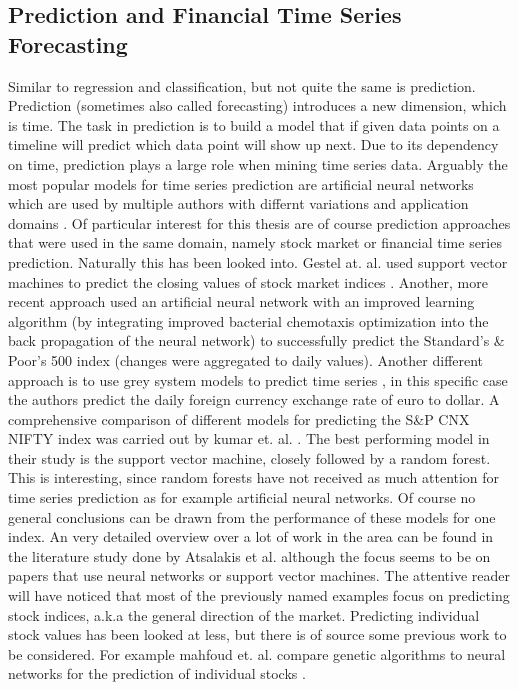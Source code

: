 \subsection{Prediction and Financial Time Series Forecasting}
\label{subsec_prediction}
Similar to regression and classification, but not quite the same is prediction. Prediction (sometimes also called forecasting) introduces a new dimension, which is time. The task in prediction is to build a model that if given data points on a timeline will predict which data point will show up next.
Due to its dependency on time, prediction plays a large role when mining time series data. Arguably the most popular models for time series prediction are artificial neural networks which are used by multiple authors with differnt variations and application domains \cite{connor1994recurrent} \cite{martinetz1993neural} \cite{frank2001time}. Of particular interest for this thesis are of course prediction approaches that were used in the same domain, namely stock market or financial time series prediction. Naturally this has been looked into. Gestel at. al. used support vector machines to predict the closing values of stock market indices \cite{van2001financial}.%
Another, more recent approach used an artificial neural network with an improved learning algorithm (by integrating improved bacterial chemotaxis optimization into the back propagation of the neural network) to successfully predict the Standard’s \& Poor’s 500 index (changes were aggregated to daily values).
Another different approach is to use grey system models to predict time series \citep{kayacan2010grey}, in this specific case the authors predict the daily foreign currency exchange rate of euro to dollar. A comprehensive comparison of different models for predicting the S\&P CNX NIFTY index was carried out by kumar et. al. \citep{kumar2006forecasting}. The best performing model in their study is the support vector machine, closely followed by a random forest. This is interesting, since random forests have not received as much attention for time series prediction as for example artificial neural networks. Of course no general conclusions can be drawn from the performance of these models for one index. An very detailed overview over a lot of work in the area can be found in the literature study done by Atsalakis et al. \cite{atsalakis2009surveying} although the focus seems to be on papers that use neural networks or support vector machines.
The attentive reader will have noticed that most of the previously named examples focus on predicting stock indices, a.k.a the general direction of the market. Predicting individual stock values has been looked at less, but there is of source some previous work to be considered. For example mahfoud et. al. compare genetic algorithms to neural networks for the prediction of individual stocks \cite{mahfoud1996financial}.


